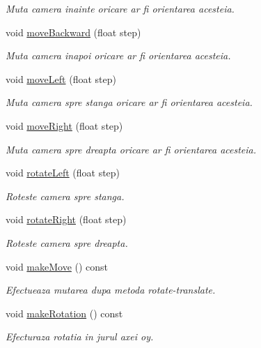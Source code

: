 \begin{DoxyCompactItemize}
\begin{DoxyCompactList}\small\item\em Muta camera inainte oricare ar fi orientarea acesteia. \end{DoxyCompactList}\item 
void \hyperlink{class_camera_a2a687c711d5f46a6c9de4513c4e334cc}{move\-Backward} (float step)
\begin{DoxyCompactList}\small\item\em Muta camera inapoi oricare ar fi orientarea acesteia. \end{DoxyCompactList}\item 
void \hyperlink{class_camera_a9733e299c281288208e4ce36681143a6}{move\-Left} (float step)
\begin{DoxyCompactList}\small\item\em Muta camera spre stanga oricare ar fi orientarea acesteia. \end{DoxyCompactList}\item 
void \hyperlink{class_camera_a70f638369d8bbcb60639f5b1cc40de19}{move\-Right} (float step)
\begin{DoxyCompactList}\small\item\em Muta camera spre dreapta oricare ar fi orientarea acesteia. \end{DoxyCompactList}\item 
void \hyperlink{class_camera_a61e15d0587412375261ca39de2f4776b}{rotate\-Left} (float step)
\begin{DoxyCompactList}\small\item\em Roteste camera spre stanga. \end{DoxyCompactList}\item 
void \hyperlink{class_camera_a149d10b600ac1d5b91430cdf9a3dae7d}{rotate\-Right} (float step)
\begin{DoxyCompactList}\small\item\em Roteste camera spre dreapta. \end{DoxyCompactList}\item 
void \hyperlink{class_camera_a5499e626fe539645aa4831369e93851a}{make\-Move} () const 
\begin{DoxyCompactList}\small\item\em Efectueaza mutarea dupa metoda rotate-\/translate. \end{DoxyCompactList}\item 
void \hyperlink{class_camera_aeb07ceb5fc0f41709f3fdfa13c87252c}{make\-Rotation} () const 
\begin{DoxyCompactList}\small\item\em Efecturaza rotatia in jurul axei oy. \end{DoxyCompactList}\item 

\end{DoxyCompactItemize}
